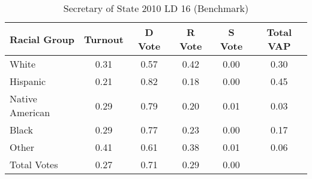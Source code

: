 \begin{table}[htb]
\begin{center}
\caption{Secretary of State 2010 LD 16 (Benchmark)}
\label{sos10_vap_ld_16_benchmark}
\begin{tabular}{lccccc}
  \hline
Racial Group & Turnout & D Vote & R Vote & S Vote & Total VAP \\ 
  \hline
White & 0.31 & 0.57 & 0.42 & 0.00 & 0.30 \\ 
  Hispanic & 0.21 & 0.82 & 0.18 & 0.00 & 0.45 \\ 
  Native American & 0.29 & 0.79 & 0.20 & 0.01 & 0.03 \\ 
  Black & 0.29 & 0.77 & 0.23 & 0.00 & 0.17 \\ 
  Other & 0.41 & 0.61 & 0.38 & 0.01 & 0.06 \\ 
  Total Votes & 0.27 & 0.71 & 0.29 & 0.00 &  \\ 
   \hline
\end{tabular}
\end{center}
\end{table}
